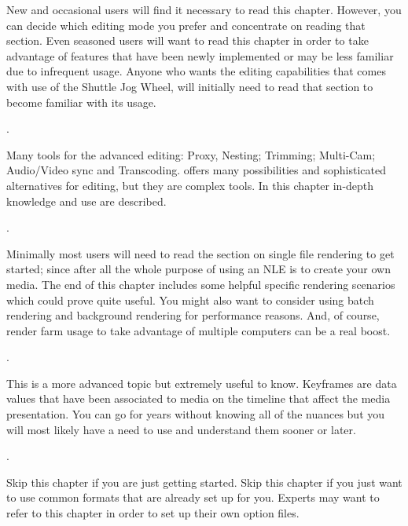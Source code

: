 \begin{description}
        New and occasional users will find it necessary to read this chapter. However, you can decide which editing mode you prefer and concentrate on reading that section.
        Even seasoned users will want to read this chapter in order to take advantage of features that have been newly implemented or may be less familiar due to infrequent usage.
        Anyone who wants the editing capabilities that comes with use of the Shuttle Jog Wheel, will initially need to read that section to become familiar with its usage.
        
     \item[Chapter~\ref{cha:advanced_editing}] .
     
     	Many tools for the advanced editing: Proxy, Nesting; Trimming; Multi-Cam; Audio/Video sync and Transcoding. \CGG{} offers many possibilities and sophisticated alternatives for editing, but they are complex tools. In this chapter in-depth knowledge and use are described.

    \item[Chapter~\ref{cha:rendering}] .

        Minimally most users will need to read the section on single file rendering to get started; since after all the whole purpose of using an NLE is to create your own media.
        The end of this chapter includes some helpful specific rendering scenarios which could prove quite useful.
        You might also want to consider using batch rendering and background rendering for performance reasons.
        And, of course, render farm usage to take advantage of multiple computers can be a real boost.

    \item[Chapter~\ref{cha:keyframes}] .

        This is a more advanced topic but extremely useful to know.
        Keyframes are data values that have been associated to media on the timeline that affect the media presentation.
        You can go for years without knowing all of the nuances but you will most likely have a need to use and understand them sooner or later.

    \item[Chapter~\ref{cha:ffmpeg_interactions}] .

        Skip this chapter if you are just getting started. Skip this chapter if you just want to use common
        formats that are already set up for you. Experts may want to refer to this chapter in order to set up their
        own option files.


\end{description}
